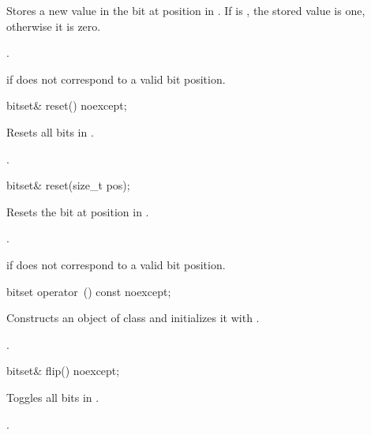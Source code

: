 \begin{itemdescr}
\pnum
\effects
Stores a new value in the bit at position  in
.
If  is , the stored value is one, otherwise it is zero.

\pnum
\returns
{}.

\pnum
\throws
{}%
 if  does not correspond to a valid bit position.
\end{itemdescr}

%
\begin{itemdecl}
bitset& reset() noexcept;
\end{itemdecl}

\begin{itemdescr}
\pnum
\effects
Resets all bits in
.

\pnum
\returns
{}.
\end{itemdescr}

%
\begin{itemdecl}
bitset& reset(size_t pos);
\end{itemdecl}

\begin{itemdescr}
\pnum
\effects
Resets the bit at position  in
.

\pnum
\returns
{}.

\pnum
\throws
{}%
 if  does not correspond to a valid bit position.
\end{itemdescr}

%
\begin{itemdecl}
bitset operator~() const noexcept;
\end{itemdecl}

\begin{itemdescr}
\pnum
\effects
Constructs an object  of class
and initializes it with
.

\pnum
\returns
{}.
\end{itemdescr}

%
\begin{itemdecl}
bitset& flip() noexcept;
\end{itemdecl}

\begin{itemdescr}
\pnum
\effects
Toggles all bits in
.

\pnum
\returns
{}.
\end{itemdescr}

